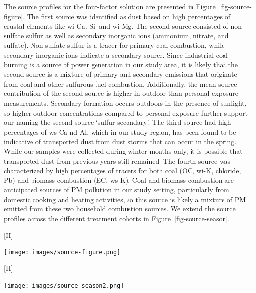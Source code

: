 \documentclass[
  letterpaper,
  DIV=11,
  numbers=noendperiod]{scrartcl}
\makeatletter
\renewenvironment{figure}%
   {\renewcommand\familydefault\sfdefault
    \@float{figure}}
   {\end@float}
\makeatother
\begin{document}
The source profiles for the four-factor solution are presented in
Figure~\ref{fig-source-figure}. The first source was identified as dust
based on high percentages of crustal elements like wi-Ca, Si, and wi-Mg.
The second source consisted of non-sulfate sulfur as well as secondary
inorganic ions (ammonium, nitrate, and sulfate). Non-sulfate sulfur is a
tracer for primary coal combustion, while secondary inorganic ions
indicate a secondary source. Since industrial coal burning is a source
of power generation in our study area, it is likely that the second
source is a mixture of primary and secondary emissions that originate
from coal and other sulfurous fuel combustion. Additionally, the mean
source contribution of the second source is higher in outdoor than
personal exposure measurements. Secondary formation occurs outdoors in
the presence of sunlight, so higher outdoor concentrations compared to
personal exposure further support our naming the second source `sulfur
secondary'. The third source had high percentages of ws-Ca nd Al, which
in our study region, has been found to be indicative of transported dust
from dust storms that can occur in the spring. While our samples were
collected during winter months only, it is possible that transported
dust from previous years still remained. The fourth source was
characterized by high percentages of tracers for both coal (OC, wi-K,
chloride, Pb) and biomass combustion (EC, ws-K). Coal and biomass
combustion are anticipated sources of PM pollution in our study setting,
particularly from domestic cooking and heating activities, so this
source is likely a mixture of PM emitted from these two household
combustion sources. We extend the source profiles across the different
treatment cohorts in Figure~\ref{fig-source-season}.

\begin{figure}[H]

{\centering \texttt{[image: images/source-figure.png]}

}

\caption{\label{fig-source-figure}Source profiles for the 4-factor PMF
solution to the sum of elements, ions, elemental carbon, and organic
carbon for outdoor and personal PM\textsubscript{2.5} exposure
measurements. The lines separate the major contributing species to each
source}

\end{figure}

\begin{figure}[H]

{\centering \texttt{[image: images/source-season2.png]}

}

\caption{\label{fig-source-season}Arithmetic mean dispersion normalized
source contributions found from the 4-factor PMF solution for \textbf{A}
outdoor and \textbf{B} personal PM\textsubscript{2.5} exposure samples
by year the group received treatment.}

\end{figure}
\end{document}
